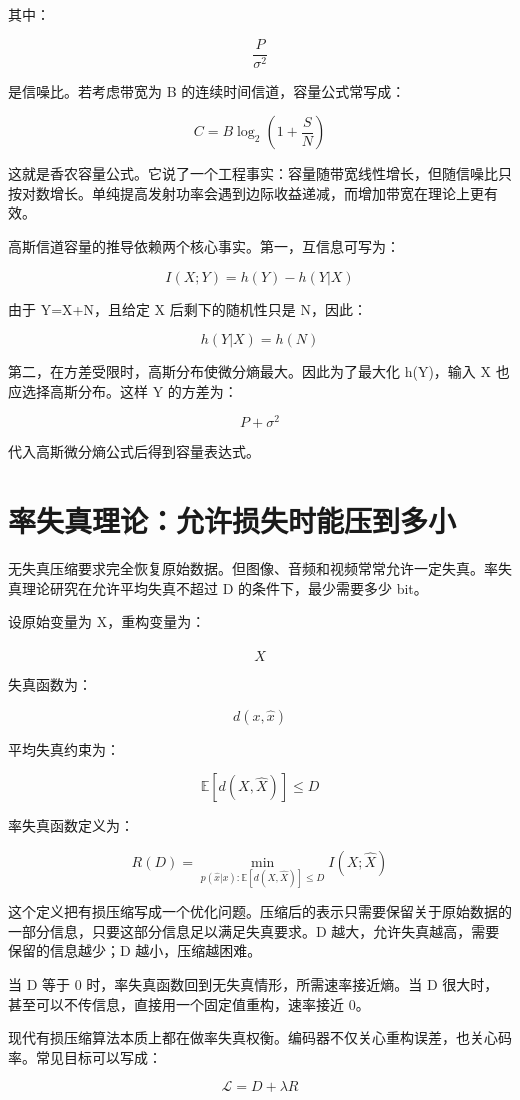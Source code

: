 其中：

\[
\frac{P}{\sigma^2}
\]

是信噪比。若考虑带宽为 B 的连续时间信道，容量公式常写成：

\[
C=B\log_2\left(1+\frac{S}{N}\right)
\]

这就是香农容量公式。它说了一个工程事实：容量随带宽线性增长，但随信噪比只按对数增长。单纯提高发射功率会遇到边际收益递减，而增加带宽在理论上更有效。

高斯信道容量的推导依赖两个核心事实。第一，互信息可写为：

\[
I(X;Y)=h(Y)-h(Y|X)
\]

由于 Y=X+N，且给定 X 后剩下的随机性只是 N，因此：

\[
h(Y|X)=h(N)
\]

第二，在方差受限时，高斯分布使微分熵最大。因此为了最大化 h(Y)，输入 X 也应选择高斯分布。这样 Y 的方差为：

\[
P+\sigma^2
\]

代入高斯微分熵公式后得到容量表达式。

\section{率失真理论：允许损失时能压到多小}

无失真压缩要求完全恢复原始数据。但图像、音频和视频常常允许一定失真。率失真理论研究在允许平均失真不超过 D 的条件下，最少需要多少 bit。

设原始变量为 X，重构变量为：

\[
\hat{X}
\]

失真函数为：

\[
d(x,\hat{x})
\]

平均失真约束为：

\[
\mathbb{E}[d(X,\hat{X})]\le D
\]

率失真函数定义为：

\[
R(D)=\min_{p(\hat{x}|x):\mathbb{E}[d(X,\hat{X})]\le D} I(X;\hat{X})
\]

这个定义把有损压缩写成一个优化问题。压缩后的表示只需要保留关于原始数据的一部分信息，只要这部分信息足以满足失真要求。D 越大，允许失真越高，需要保留的信息越少；D 越小，压缩越困难。

当 D 等于 0 时，率失真函数回到无失真情形，所需速率接近熵。当 D 很大时，甚至可以不传信息，直接用一个固定值重构，速率接近 0。

现代有损压缩算法本质上都在做率失真权衡。编码器不仅关心重构误差，也关心码率。常见目标可以写成：

\[
\mathcal{L}=D+\lambda R
\]


